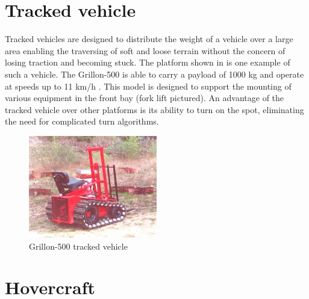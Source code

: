 \documentclass[main.tex]{subfiles}
\begin{document}
\begin{appendices}
\section{Tracked vehicle}
Tracked vehicles are designed to distribute the weight of a vehicle over a large area enabling the traversing of soft and loose terrain without the concern of losing traction and becoming stuck. The platform shown in  is one example of such a vehicle. The Grillon-500 is able to carry a payload of 1000 kg and operate at speeds up to 11 km/h \parencite{cinamGrillon}. This model is designed to support the mounting of various equipment in the front bay (fork lift pictured). An advantage of the tracked vehicle over other platforms is its ability to turn on the spot, eliminating the need for complicated turn algorithms. 
\begin{figure}[ht]
\includegraphics[width=0.5\textwidth]{8-Appendices/Grillon-500.jpg}
\centering
\caption[Grillon-500 tracked vehicle]{Grillon-500 tracked vehicle \parencite{cinamGrillon}} 
\end{figure}

\section{Hovercraft}


\end{appendices}
\end{document}
